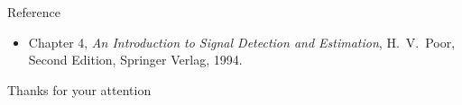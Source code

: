 \documentclass[t]{beamer}
\begin{document}
\begin{frame}{Reference}
  \begin{itemize}
    \item  Chapter 4, \textit{An Introduction to Signal Detection and Estimation}, H.~V.~Poor, Second Edition, Springer Verlag, 1994.
  \end{itemize}
\end{frame}

\begin{frame}{}
\vfill
\begin{center}
Thanks for your attention
\end{center}
\vfill
\end{frame}
\end{document}
